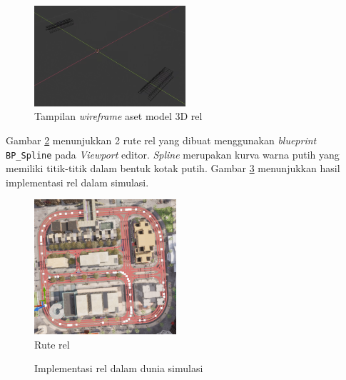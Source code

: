 \begin{figure}[!h]
    \centering
    \includegraphics[width=0.5\textwidth]{resources/chapter-4/rel-mesh.png}
    \caption{Tampilan \textit{wireframe} aset model 3D rel}
    \label{fig:rel-mesh}
\end{figure}

Gambar \ref{fig:rel-route} menunjukkan 2 rute rel yang dibuat menggunakan
\textit{blueprint} \verb|BP_Spline| pada \textit{Viewport} editor.
\textit{Spline} merupakan kurva warna putih yang memiliki titik-titik dalam
bentuk kotak putih. Gambar \ref{fig:rel} menunjukkan hasil implementasi rel
dalam simulasi.

\begin{figure}[!h]
    \centering
    \includegraphics[width=0.47\textwidth]{resources/chapter-4/rel-route.png}
    \caption{Rute rel}
    \label{fig:rel-route}
\end{figure}

\begin{figure}[!h]
    \centering
    \hfill
    \caption{Implementasi rel dalam dunia simulasi}
    \label{fig:rel}
\end{figure}

